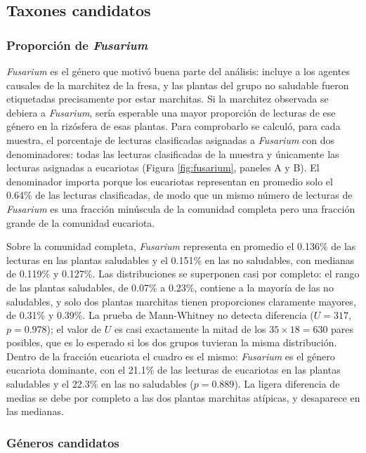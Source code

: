 \subsection{Taxones candidatos}
\label{sec:res-candidatos}

\subsubsection{Proporción de \textit{Fusarium}}

\textit{Fusarium} es el género que motivó buena parte del análisis: incluye a los agentes causales de
la marchitez de la fresa, y las plantas del grupo no saludable fueron etiquetadas precisamente por
estar marchitas. Si la marchitez observada se debiera a \textit{Fusarium}, sería esperable una mayor
proporción de lecturas de ese género en la rizósfera de esas plantas. Para comprobarlo se calculó,
para cada muestra, el porcentaje de lecturas clasificadas asignadas a \textit{Fusarium} con dos
denominadores: todas las lecturas clasificadas de la muestra y únicamente las lecturas asignadas a
eucariotas (Figura \ref{fig:fusarium}, paneles A y B). El denominador importa porque los eucariotas
representan en promedio solo el 0.64\% de las lecturas clasificadas, de modo que un mismo número de
lecturas de \textit{Fusarium} es una fracción minúscula de la comunidad completa pero una fracción
grande de la comunidad eucariota.

Sobre la comunidad completa, \textit{Fusarium} representa en promedio el 0.136\% de las lecturas en
las plantas saludables y el 0.151\% en las no saludables, con medianas de 0.119\% y 0.127\%. Las
distribuciones se superponen casi por completo: el rango de las plantas saludables, de 0.07\% a
0.23\%, contiene a la mayoría de las no saludables, y solo dos plantas marchitas tienen proporciones
claramente mayores, de 0.31\% y 0.39\%. La prueba de Mann-Whitney no detecta diferencia
($U = 317$, $p = 0.978$); el valor de $U$ es casi exactamente la mitad de los $35 \times 18 = 630$
pares posibles, que es lo esperado si los dos grupos tuvieran la misma distribución. Dentro de la
fracción eucariota el cuadro es el mismo: \textit{Fusarium} es el género eucariota dominante, con el
21.1\% de las lecturas de eucariotas en las plantas saludables y el 22.3\% en las no saludables
($p = 0.889$). La ligera diferencia de medias se debe por completo a las dos plantas marchitas
atípicas, y desaparece en las medianas.

\subsubsection{Géneros candidatos}

